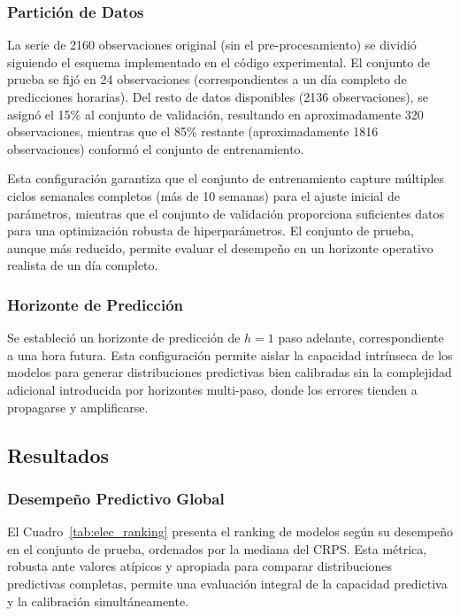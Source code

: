 \subsubsection{Partición de Datos}

La serie de 2160 observaciones original (sin el pre-procesamiento) se dividió siguiendo el esquema implementado en el código experimental. El conjunto de prueba se fijó en 24 observaciones (correspondientes a un día completo de predicciones horarias). Del resto de datos disponibles (2136 observaciones), se asignó el 15\% al conjunto de validación, resultando en aproximadamente 320 observaciones, mientras que el 85\% restante (aproximadamente 1816 observaciones) conformó el conjunto de entrenamiento. 

Esta configuración garantiza que el conjunto de entrenamiento capture múltiples ciclos semanales completos (más de 10 semanas) para el ajuste inicial de parámetros, mientras que el conjunto de validación proporciona suficientes datos para una optimización robusta de hiperparámetros. El conjunto de prueba, aunque más reducido, permite evaluar el desempeño en un horizonte operativo realista de un día completo.

\subsubsection{Horizonte de Predicción}

Se estableció un horizonte de predicción de $h = 1$ paso adelante, correspondiente a una hora futura. Esta configuración permite aislar la capacidad intrínseca de los modelos para generar distribuciones predictivas bien calibradas sin la complejidad adicional introducida por horizontes multi-paso, donde los errores tienden a propagarse y amplificarse.

\subsection{Resultados}
\label{subsec:elec_resultados}

\subsubsection{Desempeño Predictivo Global}

El Cuadro~\ref{tab:elec_ranking} presenta el ranking de modelos según su desempeño en el conjunto de prueba, ordenados por la mediana del CRPS. Esta métrica, robusta ante valores atípicos y apropiada para comparar distribuciones predictivas completas, permite una evaluación integral de la capacidad predictiva y la calibración simultáneamente.

